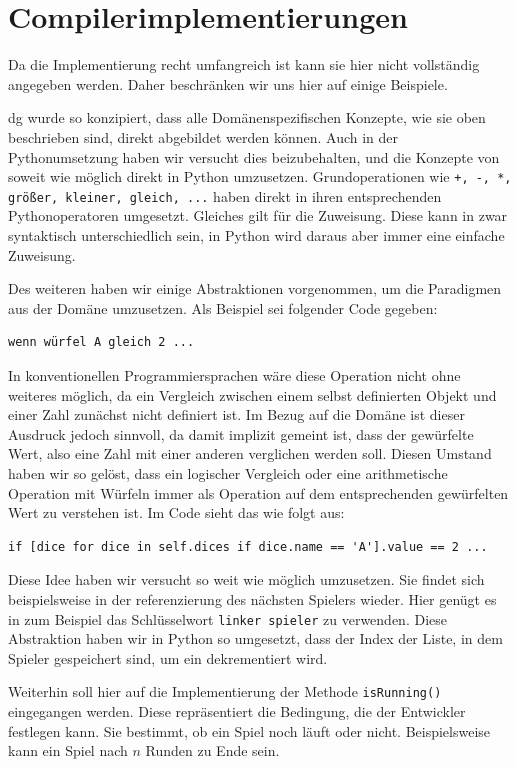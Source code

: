 \section{Compilerimplementierungen}
\label{sec:compilerimplementierungen}
	Da die Implementierung recht umfangreich ist kann sie hier nicht vollständig angegeben werden. Daher beschränken wir uns hier auf einige Beispiele.
	
dg wurde so konzipiert, dass alle Domänenspezifischen Konzepte, wie sie oben beschrieben sind, direkt abgebildet werden können. Auch in der Pythonumsetzung haben wir versucht dies beizubehalten, und die Konzepte von \dg soweit wie möglich direkt in Python umzusetzen. Grundoperationen wie \texttt{+, -, *, größer, kleiner, gleich, ...} haben direkt in ihren entsprechenden Pythonoperatoren umgesetzt. Gleiches gilt für die Zuweisung. Diese kann in \dg zwar syntaktisch unterschiedlich sein, in Python wird daraus aber immer eine einfache Zuweisung.
	
		Des weiteren haben wir einige Abstraktionen vorgenommen, um die Paradigmen aus der Domäne umzusetzen. Als Beispiel sei folgender Code gegeben:
\begin{lstlisting}
wenn würfel A gleich 2 ...
\end{lstlisting}
		In konventionellen Programmiersprachen wäre diese Operation nicht ohne weiteres möglich, da ein Vergleich zwischen einem selbst definierten Objekt und einer Zahl zunächst nicht definiert ist. Im Bezug auf die Domäne ist dieser Ausdruck jedoch sinnvoll, da damit implizit gemeint ist, dass der gewürfelte Wert, also eine Zahl mit einer anderen verglichen werden soll. Diesen Umstand haben wir so gelöst, dass ein logischer Vergleich oder eine arithmetische Operation mit Würfeln immer als Operation auf dem entsprechenden gewürfelten Wert zu verstehen ist. Im Code sieht das wie folgt aus:

\begin{lstlisting}
if [dice for dice in self.dices if dice.name == 'A'].value == 2 ...
\end{lstlisting}
Diese Idee haben wir versucht so weit wie möglich umzusetzen. Sie findet sich beispielsweise in der referenzierung des nächsten Spielers wieder. Hier genügt es in \dg zum Beispiel das Schlüsselwort \texttt{linker spieler} zu verwenden. Diese Abstraktion haben wir in Python so umgesetzt, dass der Index der Liste, in dem Spieler gespeichert sind, um ein dekrementiert wird.

Weiterhin soll hier auf die Implementierung der Methode \texttt{isRunning()} eingegangen werden. Diese repräsentiert die Bedingung, die der Entwickler festlegen kann. Sie bestimmt, ob ein Spiel noch läuft oder nicht. Beispielsweise kann ein Spiel nach $n$ Runden zu Ende sein.

